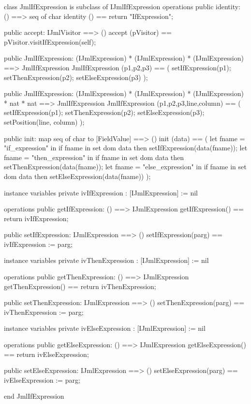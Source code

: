 \begin{vdm_al}
class JmlIfExpression is subclass of IJmlIfExpression
operations
  public identity: () ==> seq of char
  identity () == return "IfExpression";

  public accept: IJmlVisitor ==> ()
  accept (pVisitor) == pVisitor.visitIfExpression(self);

  public JmlIfExpression:
    (IJmlExpression) *
    (IJmlExpression) *
    (IJmlExpression) ==> JmlIfExpression
  JmlIfExpression (p1,p2,p3) == 
    ( setIfExpression(p1);
      setThenExpression(p2);
      setElseExpression(p3) );

  public JmlIfExpression:
    (IJmlExpression) *
    (IJmlExpression) *
    (IJmlExpression) *
    nat *
    nat ==> JmlIfExpression
  JmlIfExpression (p1,p2,p3,line,column) == 
    ( setIfExpression(p1);
      setThenExpression(p2);
      setElseExpression(p3);
      setPosition(line, column) );

  public init: map seq of char to [FieldValue] ==> ()
  init (data) ==
    ( let fname = "if_expression" in
        if fname in set dom data
        then setIfExpression(data(fname));
      let fname = "then_expression" in
        if fname in set dom data
        then setThenExpression(data(fname));
      let fname = "else_expression" in
        if fname in set dom data
        then setElseExpression(data(fname)) );

instance variables
  private ivIfExpression : [IJmlExpression] := nil

operations
  public getIfExpression: () ==> IJmlExpression
  getIfExpression() == return ivIfExpression;

  public setIfExpression: IJmlExpression ==> ()
  setIfExpression(parg) == ivIfExpression := parg;

instance variables
  private ivThenExpression : [IJmlExpression] := nil

operations
  public getThenExpression: () ==> IJmlExpression
  getThenExpression() == return ivThenExpression;

  public setThenExpression: IJmlExpression ==> ()
  setThenExpression(parg) == ivThenExpression := parg;

instance variables
  private ivElseExpression : [IJmlExpression] := nil

operations
  public getElseExpression: () ==> IJmlExpression
  getElseExpression() == return ivElseExpression;

  public setElseExpression: IJmlExpression ==> ()
  setElseExpression(parg) == ivElseExpression := parg;

end JmlIfExpression
\end{vdm_al}


